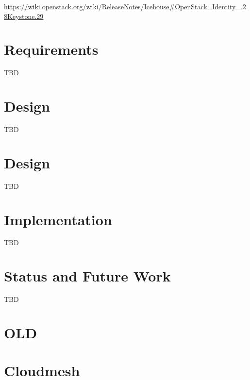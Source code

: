 \documentclass{tex/sig-alternate}
\begin{document}
  \url{https://wiki.openstack.org/wiki/ReleaseNotes/Icehouse#OpenStack_Identity_.28Keystone.29}



\section{Requirements}

TBD

\section{Design}

TBD
\section{Design}

TBD

\section{Implementation}

TBD

\section{Status and Future Work}

TBD


\section{OLD}


\section{Cloudmesh}\label{S:cloudmesh}
\end{document}
